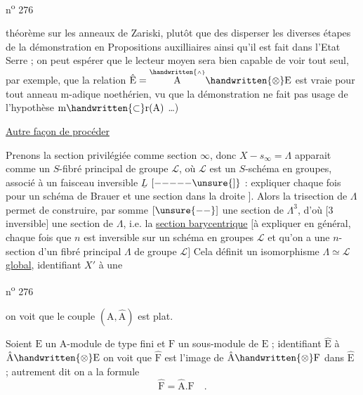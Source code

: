 
n\textsuperscript{o} 276

théorème sur les anneaux de Zariski, plutôt que des disperser les diverses étapes de la démonstration en Propositions auxilliaires ainsi qu'il est fait dans l'Etat Serre ; on peut espérer que le lecteur moyen sera bien capable de voir tout seul, par exemple, que la relation $\hat{\mathrm E}=\overset{\handwritten{\scriptscriptstyle\wedge}}{\mathrm A}\handwritten{\otimes}\mathrm E$ est vraie pour tout anneau $\mathrm m$-adique noethérien, vu que la démonstration ne fait pas usage de l'hypothèse $\mathrm m\handwritten{\subset}\mathrm r(\mathrm A)$ \ldots)

\uline{Autre façon de procéder}

Prenons la section privilégiée comme section $\infty$, donc $X-s_{\infty}=\Lambda$ apparait comme un $S$-fibré principal   de groupe $\mathcal L$, où $\mathcal L$ est un $S$-schéma en groupes, associé à un  faisceau inversible $\underline L$ \margin{$\Vert$} $[\mathord{-}\mathord{-}\mathord{-}\mathord{-}\mathord{-}\unsure{]}$ : expliquer chaque fois pour un schéma de Brauer  et une section dans la droite \unsure{--}$]$. Alors la  trisection de $\Lambda$ permet de construire, par somme $[\unsure{--}]$ une section de $\Lambda^{3}$, d'où $[3$  inversible$]$ une section de $\Lambda$, i.e. la \uline{section barycentrique} $[$à expliquer en général, chaque fois que $n$ est inversible sur un schéma en groupes  $\mathcal L$ et qu'on a une $n$-section d'un fibré principal $\Lambda$ de groupe $\mathcal L]$ Cela définit un isomorphisme $\Lambda\simeq\mathcal L$ \uline{global}, identifiant $X'$ à une


n\textsuperscript{o} 276

on voit que le couple $(\mathrm A,\hat{\mathrm A})$ est plat.

Soient $\mathrm E$ un $\mathrm A$-module de type fini et $\mathrm F$ un sous-module de $\mathrm E$ ; identifiant $\hat{\mathrm E}$ à $\hat{\mathrm A}\handwritten{\otimes}\mathrm E$ on voit que $\hat{\mathrm F}$ est l'image de $\hat{\mathrm A}\handwritten{\otimes}\mathrm F$ dans $\hat{\mathrm E}$ ; autrement dit on a la formule
\[
\hat{\mathrm F}=\hat{\mathrm A}.\mathrm F\quad .
\]

